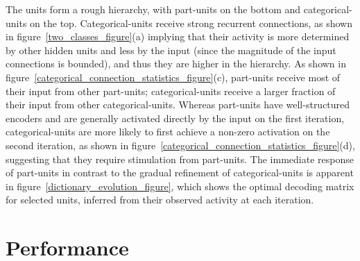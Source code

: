 \documentclass{article} %
\begin{document}
The units form a rough hierarchy, with part-units on the bottom and categorical-units on the top.  
Categorical-units receive strong recurrent connections, as shown in figure~\ref{two_classes_figure}(a) implying that their activity is more determined by other hidden units and less by the input (since the magnitude of the input connections is bounded), and thus they are higher in the hierarchy.  
As shown in figure~\ref{categorical_connection_statistics_figure}(c), part-units receive most of their input from other part-units; categorical-units receive a larger fraction of their input from other categorical-units.  %
Whereas part-units have well-structured encoders and are generally activated directly by the input on the first iteration, categorical-units are more likely to first achieve a non-zero activation on the second iteration, as shown in figure~\ref{categorical_connection_statistics_figure}(d), suggesting that they require stimulation from part-units.  The immediate response of part-units in contrast to the gradual refinement of categorical-units is apparent in figure~\ref{dictionary_evolution_figure}, which shows the optimal decoding matrix for selected units, inferred from their observed activity at each iteration.  %





\section{Performance}
\end{document}
